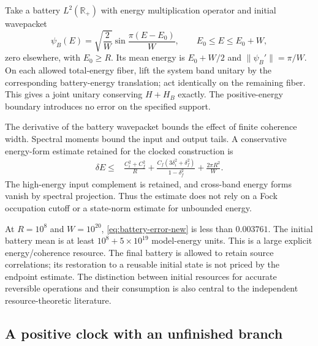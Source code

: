 Take a battery $L^2(\mathbb R_+)$ with energy multiplication operator and
initial wavepacket
\begin{equation}
\psi_B(E)=\sqrt{\frac2W}
\sin\frac{\pi(E-E_0)}W,\qquad E_0\leq E\leq E_0+W,
\end{equation}
zero elsewhere, with $E_0\geq R$. Its mean energy is $E_0+W/2$ and
$\|\psi_B'\|=\pi/W$. On each allowed total-energy fiber, lift the system
band unitary by the corresponding battery-energy translation; act
identically on the remaining fiber. This gives a joint unitary conserving
$H+H_B$ exactly. The positive-energy boundary introduces no error on the
specified support.

The derivative of the battery wavepacket bounds the effect of finite
coherence width. Spectral moments bound the input and output tails. A
conservative energy-form estimate retained for the clocked construction is
\begin{equation}
\begin{split}
\delta E\leq{}&\frac{C_i^2+C_f^2}{R}
+\frac{C_f(3\delta_i^2+\delta_f^2)}{1-\delta_f^2}
+\frac{2\pi R^2}{W}.
\end{split}
\label{eq:battery-error-new}
\end{equation}
The high-energy input complement is retained, and cross-band energy forms
vanish by spectral projection. Thus the estimate does not rely on a Fock
occupation cutoff or a state-norm estimate for unbounded energy.

At $R=10^8$ and $W=10^{20}$, \eqref{eq:battery-error-new} is less than
$0.003761$. The initial battery mean is at least $10^8+5\times10^{19}$
model-energy units. This is a large explicit energy/coherence resource.
The final battery is allowed to retain source correlations; its restoration
to a reusable initial state is not priced by the endpoint estimate.
The distinction between initial resources for accurate reversible
operations and their consumption is also central to the independent
resource-theoretic literature.

\subsection{A positive clock with an unfinished branch}

